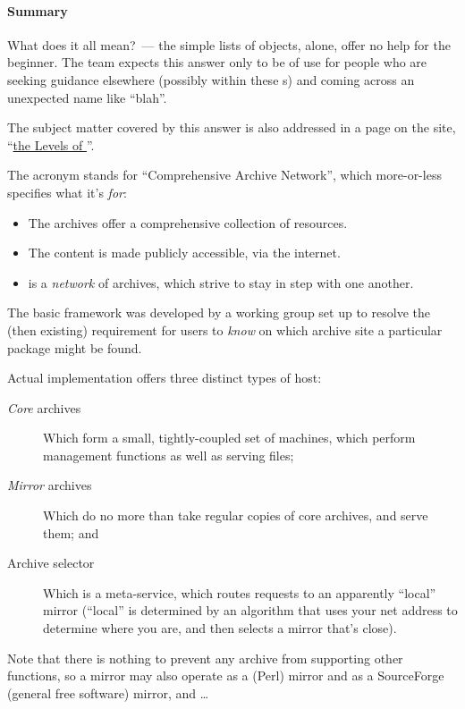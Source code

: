 \paragraph{Summary}
What does it all mean?~--- the simple lists of objects, alone, offer
no help for the beginner.  The  team expects this answer
only to be of use for people who are seeking guidance elsewhere
(possibly within these s) and coming across an unexpected
name like ``blah\tex{}''.

The subject matter covered by this answer is also addressed in a page
on the  site, %
``\href{http://tug.org/levels.html}{the Levels of \tex{}}''.


The acronym stands for ``Comprehensive \tex{} Archive Network'', which
more-or-less specifies what it's \emph{for}:
\begin{itemize}
\item The archives offer a comprehensive collection of \tex{} resources.
\item The content is made publicly accessible, via the internet.
\item {} is a \emph{network} of archives, which strive to
  stay in step with one another.
\end{itemize}
The basic framework was developed by a  working group set up
to resolve the (then existing) requirement for users to \emph{know} on
which archive site a particular package might be found.

Actual implementation offers three distinct types of host:
\begin{description}
\item[\emph{Core} archives]Which form a small, tightly-coupled set of
  machines, which perform management functions as well as serving
  files;
\item[\emph{Mirror} archives]Which do no more than take regular copies
  of core archives, and serve them; and
\item[Archive selector]Which is a meta-service, which routes requests
  to an apparently ``local'' mirror (``local'' is determined by an
  algorithm that uses your net address to determine where you are, and
  then selects a mirror that's close).
\end{description}
Note that there is nothing to prevent any archive from supporting
other functions, so a  mirror may also operate as a
 (Perl) mirror and as a SourceForge (general free software)
mirror, and \dots{}


